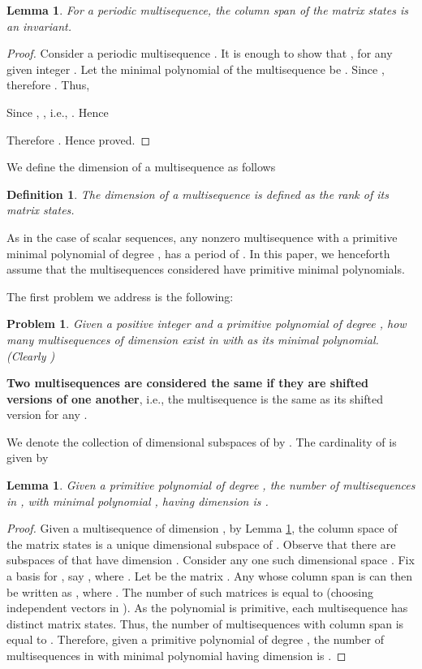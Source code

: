 \documentclass[letterpaper, 12 pt]{article}  \usepackage{amssymb}
\newtheorem{lemma}[theorem]{Lemma}
\newtheorem{definition}[theorem]{Definition}
\newtheorem{problem}{Problem}
\begin{document}
\begin{lemma}
\label{span}
For a periodic multisequence, the column span of the matrix states is an
invariant.
\end{lemma}

\begin{proof}
Consider a periodic multisequence . It is enough to show that
, for any given integer .
 Let the minimal polynomial of the multisequence be . Since , therefore .
Thus,

Since , , i.e., . Hence 

Therefore . Hence proved.  


\end{proof}

We define the dimension of a multisequence as follows
\begin{definition}
The dimension of a multisequence  is defined as the rank of its matrix
states.
\end{definition}

As in the case of scalar sequences, any nonzero multisequence with a primitive
minimal polynomial  of degree , has a period of .
In this paper, we henceforth assume that the multisequences considered
have primitive minimal polynomials.

The first problem we address is the following:
\begin{problem}
 Given a positive integer  and a primitive polynomial  of degree
, how many
multisequences of dimension  exist in  with  as its minimal
polynomial. (Clearly )
\end{problem}
 
 {\bf Two multisequences are considered the same if they
are
shifted versions of one another}, i.e., the multisequence  is the same as 
its shifted version   for any . 

 We denote the collection of  dimensional
subspaces of
 by . The cardinality of   is given by

 
\begin{lemma}
\label{NoMult}
Given a primitive polynomial  of degree , the number of
multisequences in , with minimal polynomial , having dimension
 is .
\end{lemma}

\begin{proof}
 Given a multisequence  of dimension , by Lemma \ref{span},  
the column space of the matrix states  is a unique 
dimensional
subspace of .
Observe that there are  subspaces of  that have
dimension . Consider any one such  dimensional space . Fix  a
basis
for , say , where . Let  be
the matrix . Any  whose column span is  can then be written as ,
where . The number of such matrices  is equal to 
 (choosing  independent vectors in
). As the polynomial  is primitive, 
each multisequence has  distinct matrix states. Thus,
the number of multisequences with column span  is
equal to . Therefore, given a primitive
polynomial  of degree , the number of
multisequences in  with minimal polynomial  having dimension
 is .
\end{proof}
\end{document}
